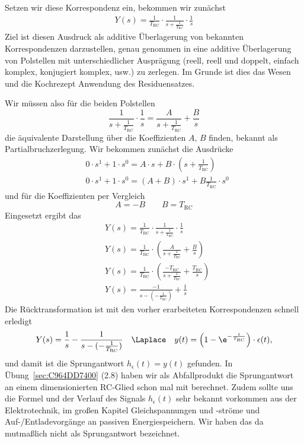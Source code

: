 \begin{Loesung}
\begin{itemize}
Setzen wir diese Korrespondenz ein, bekommen wir zunächst
\begin{align}
Y(s) = \frac{1}{T_\mathrm{RC}}\cdot\frac{1}{s + \frac{1}{T_\mathrm{RC}}} \cdot \frac{1}{s}
\end{align}
Ziel ist diesen Ausdruck als additive Überlagerung von bekannten Korrespondenzen
darzustellen, genau genommen in eine additive Überlagerung von Polstellen mit
unterschiedlicher Ausprägung
(reell, reell und doppelt, einfach komplex, konjugiert komplex, usw.) zu zerlegen.
Im Grunde ist dies das Wesen und die Kochrezept Anwendung des Residuensatzes.

Wir müssen also für die beiden Polstellen
\begin{equation}
\frac{1}{s + \frac{1}{T_\mathrm{RC}}} \cdot \frac{1}{s} =
\frac{A}{s + \frac{1}{T_\mathrm{RC}}} + \frac{B}{s}
\end{equation}
die äquivalente Darstellung über die Koeffizienten $A$, $B$ finden, bekannt als
Partialbruchzerlegung.
Wir bekommen zunächst die Ausdrücke
\begin{align}
&0\cdot s^1 + 1\cdot s^0 =
A\cdot s + B \cdot (s + \frac{1}{T_\mathrm{RC}})\\
&0\cdot s^1 + 1\cdot s^0 =
(A+B)\cdot s^1 + B \frac{1}{T_\mathrm{RC}} \cdot s^0
\end{align}
und für die Koeffizienten per Vergleich
\begin{equation}
  A=-B\qquad B = T_\mathrm{RC}
\end{equation}
Eingesetzt ergibt das
\begin{align}
&Y(s) = \frac{1}{T_\mathrm{RC}}\cdot\frac{1}{s + \frac{1}{T_\mathrm{RC}}} \cdot \frac{1}{s}\\
&Y(s) = \frac{1}{T_\mathrm{RC}}\cdot \left(\frac{A}{s + \frac{1}{T_\mathrm{RC}}} + \frac{B}{s}\right)\\
&Y(s) = \frac{1}{T_\mathrm{RC}}\cdot \left(\frac{-T_\mathrm{RC}}{s + \frac{1}{T_\mathrm{RC}}} + \frac{T_\mathrm{RC}}{s}\right)\\
&Y(s) = \frac{-1}{s - (-\frac{1}{T_\mathrm{RC}})} + \frac{1}{s}
\end{align}
Die Rücktransformation ist mit den vorher erarbeiteten Korrespondenzen schnell
erledigt
\begin{align}
Y(s) = \frac{1}{s} - \frac{1}{s - (-\frac{1}{T_\mathrm{RC}})} \quad \Laplace \quad
y(t) = \left(1-\e^{-\frac{t}{T_\mathrm{RC}}}\right)\cdot \epsilon(t),
\end{align}
und damit ist die Sprungantwort $h_\epsilon(t) = y(t)$ gefunden.
In Übung~\ref{sec:C964DD7400} (2.8) haben wir als Abfallprodukt die Sprungantwort an einem dimensionierten
RC-Glied schon mal mit berechnet. Zudem sollte uns die Formel und der Verlauf des
Signals $h_\epsilon(t)$ sehr bekannt vorkommen aus der Elektrotechnik,
im großen Kapitel Gleichspannungen und -ströme und Auf-/Entladevorgänge
an passiven Energiespeichern. Wir haben das
da mutmaßlich nicht als Sprungantwort bezeichnet.



\end{itemize}
\end{Loesung}
